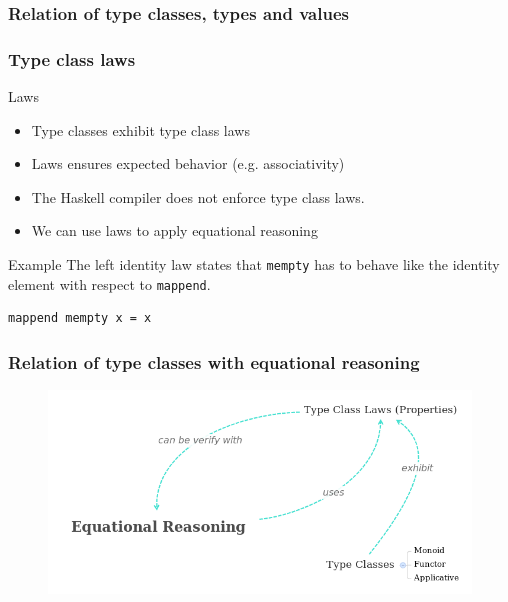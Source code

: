 \documentclass{beamer}
\begin{document}
\begin{frame}
\frametitle{Relation of type classes, types and values}


\end{frame}

\begin{frame}[fragile]
\frametitle{Type class laws}
\begin{block}{Laws}
\begin{itemize}
\item Type classes exhibit type class laws
\item Laws ensures expected behavior (e.g. associativity)
\item The Haskell compiler does not enforce type class laws.
\item We can use laws to apply equational reasoning
\end{itemize}  
\end{block}

\begin{block}{Example}
The left identity law states that \verb|mempty| has to behave like the identity element with respect to \verb|mappend|.
\begin{Verbatim}[fontsize=\small]
mappend mempty x = x
\end{Verbatim}  
\end{block}
\end{frame}

\begin{frame}
\frametitle{Relation of type classes with equational reasoning}
  \begin{figure}
  \centering
     \includegraphics[scale=0.4]{mindmap}
\end{figure}
\end{frame}
\end{document}
